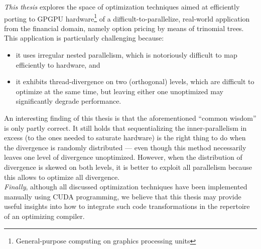 
\newpage
{\em This thesis} explores the space of optimization techniques aimed at efficiently porting to GPGPU hardware\footnote{General-purpose computing on graphics processing units} of a difficult-to-parallelize, real-world application from the financial domain, namely option pricing by means of trinomial trees.   This application is particularly challenging because:
\begin{itemize}
    \item it uses irregular nested parallelism, which is notoriously difficult to map efficiently to hardware, and 
    \item it exhibits thread-divergence on two (orthogonal) levels, which are difficult to optimize at the same time, but leaving either one unoptimized may significantly degrade performance.
\end{itemize}
An interesting finding of this thesis is that the aforementioned \enquote{common wisdom} is only partly correct. It still holds that sequentializing the inner-parallelism in excess (to the ones needed to saturate hardware) is the right thing to do when the divergence is randomly distributed --- even though this method necessarily leaves one level of divergence unoptimized. However, when the distribution of divergence is skewed on both levels, it is better to exploit all parallelism because this allows to optimize all divergence.\medskip\\
%
{\em Finally}, although all discussed optimization techniques have been implemented manually using CUDA programming, we believe that this thesis may provide useful insights into how to integrate such code  transformations in the repertoire of an optimizing compiler.

